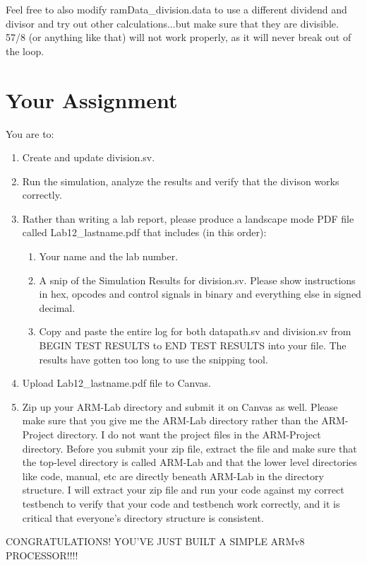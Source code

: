 Feel free to also modify ramData\_division.data to use a different dividend and divisor and try out other calculations...but make sure that they are divisible.  57/8 (or anything like that) will not work properly, as it will never break out of the loop.



\section{Your Assignment}

You are to:
\begin{enumerate}
	\item Create and update division.sv.
	\item Run the simulation, analyze the results and verify that the divison works correctly.
	\item Rather than writing a lab report, please produce a landscape mode PDF file called Lab12\_lastname.pdf that includes (in this order):
	\begin{enumerate}
		\item Your name and the lab number.
		\item A snip of the Simulation Results for division.sv.  Please show instructions in hex, opcodes and control signals in binary and everything else in signed decimal.  
		\item Copy and paste the entire log for both datapath.sv and division.sv from BEGIN TEST RESULTS to END TEST RESULTS into your file.  The results have gotten too long to use the snipping tool.	
	\end{enumerate}
\item Upload Lab12\_lastname.pdf file to Canvas.
\item Zip up your ARM-Lab directory and submit it on Canvas as well.  Please make sure that you give me the ARM-Lab directory rather than the ARM-Project directory.  I do not want the project files in the ARM-Project directory.  Before you submit your zip file, extract the file and make sure that the top-level directory is called ARM-Lab and that the lower level directories like code, manual, etc are directly beneath ARM-Lab in the directory structure.  I will extract your zip file and run your code against my correct testbench to verify that your code and testbench work correctly, and it is critical that everyone's directory structure is consistent.
\end{enumerate} 

CONGRATULATIONS!  YOU'VE JUST BUILT A SIMPLE ARMv8 PROCESSOR!!!!